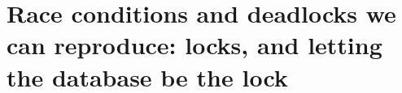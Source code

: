 \chapter{Race conditions and deadlocks we can reproduce: locks, and letting the database be the lock}
\label{ch:race-conditions-and-deadlocks-we-can}


